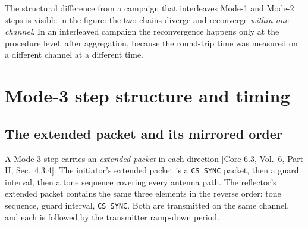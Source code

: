 \documentclass[11pt,a4paper]{article}
\newcommand{\code}[1]{\texttt{\small #1}}
\newcommand{\core}[1]{\textcolor{rulegrey}{\small[Core 6.3, #1]}}
\begin{document}
The structural difference from a campaign that interleaves Mode-1 and Mode-2 steps is visible in the
figure: the two chains diverge and reconverge \emph{within one channel}. In an interleaved campaign
the reconvergence happens only at the procedure level, after aggregation, because the round-trip time
was measured on a different channel at a different time.

\section{Mode-3 step structure and timing}
\label{sec:timing}

\subsection{The extended packet and its mirrored order}

A Mode-3 step carries an \emph{extended packet} in each direction
\core{Vol.\ 6, Part H, Sec.\ 4.3.4}. The initiator's extended packet is a \code{CS\_SYNC} packet,
then a guard interval, then a tone sequence covering every antenna path. The reflector's extended
packet contains the same three elements in the reverse order: tone sequence, guard interval,
\code{CS\_SYNC}. Both are transmitted on the same channel, and each is followed by the transmitter
ramp-down period.
\end{document}
